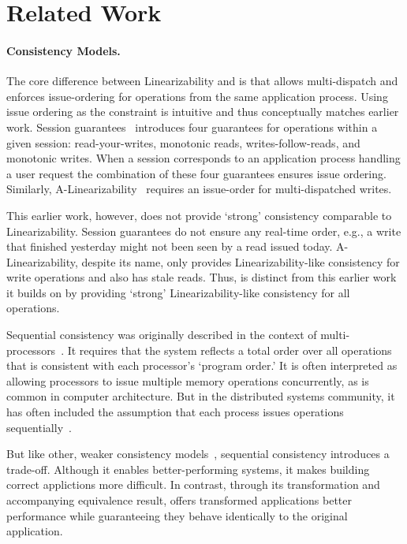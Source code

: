\section{Related Work}
\label{sec:related}


\paragraph{Consistency Models.}
The core difference between Linearizability and \mdl{} is that \mdl{} allows multi-dispatch and enforces issue-ordering for operations from the same application process.
Using issue ordering as the constraint is intuitive and thus conceptually matches earlier work.
Session guarantees~\cite{terry1994session} introduces four guarantees for operations within a given session: read-your-writes, monotonic reads, writes-follow-reads, and monotonic writes. When a session corresponds to an application process handling a user request the combination of these four guarantees ensures issue ordering.
Similarly, A-Linearizability~\cite{hunt2010zookeeper} requires an issue-order for multi-dispatched writes.

This earlier work, however, does not provide `strong' consistency comparable to Linearizability.
Session guarantees do not ensure any real-time order, e.g., a write that finished yesterday might not been seen by a read issued today.
A-Linearizability, despite its name, only provides Linearizability-like consistency for write operations and also has stale reads.
Thus, \Mdl{} is distinct from this earlier work it builds on by providing `strong' Linearizability-like consistency for all operations.

Sequential consistency was originally described in the context of
multi-processors~\cite{lamport1979sequential}. It requires that
the system reflects a total order over all operations that is 
consistent with each processor's `program order.' It is often
interpreted as allowing processors to issue multiple memory 
operations concurrently, as is common in computer architecture.
But in the distributed systems community, it has often
included the assumption that each process issues operations 
sequentially~\cite{attiya1993seqlin}.

But like other, weaker consistency
models~\cite{ahamad1995causal,lloyd2011cops,terry1995bayou,deCandia2007dynamo}, 
sequential consistency introduces a trade-off. Although it enables
better-performing systems, it makes building correct applictions more difficult. In contrast, through its transformation
and accompanying equivalence result, \MDL{} offers transformed
applications better performance while guaranteeing they behave 
identically to the original application.

